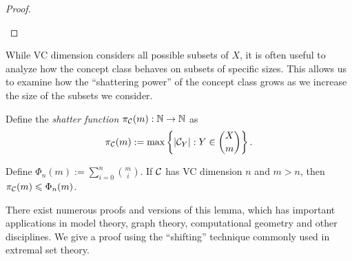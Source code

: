 \begin{proof}
\begin{outline}
\end{outline}
\end{proof}

While VC dimension considers all possible subsets of $X$, it is often useful to analyze how the concept class behaves on subsets of specific sizes. This allows us to examine how the \enquote{shattering power} of the concept class grows as we increase the size of the subsets we consider.

\begin{definition}
    \label{def:shatterfunc}
    Define the \emph{shatter function} $\pi_{\mathcal{C}}(m):\mathbb{N} \rightarrow \mathbb{N}$ as
    $$\pi_{\mathcal{C}}(m):= \max \left\{|\mathcal{C}_Y| : Y \in \binom{X}{m}\right\}.$$
\end{definition}  

\begin{lemma}
    \label{lemma:Sauer-Shelah}
    Define $\Phi_n(m):=\sum^n_{i=0}\binom{m}{i}$. If $\mathcal{C}$ has VC dimension $n$ and $m>n$, then $\pi_{\mathcal{C}}(m) \leqslant \Phi_n(m)$.
\end{lemma}

There exist numerous proofs and versions of this lemma, which has important applications in model theory, graph theory, computational geometry and other disciplines. We give a proof using the \enquote{shifting} technique commonly used in extremal set theory. 

